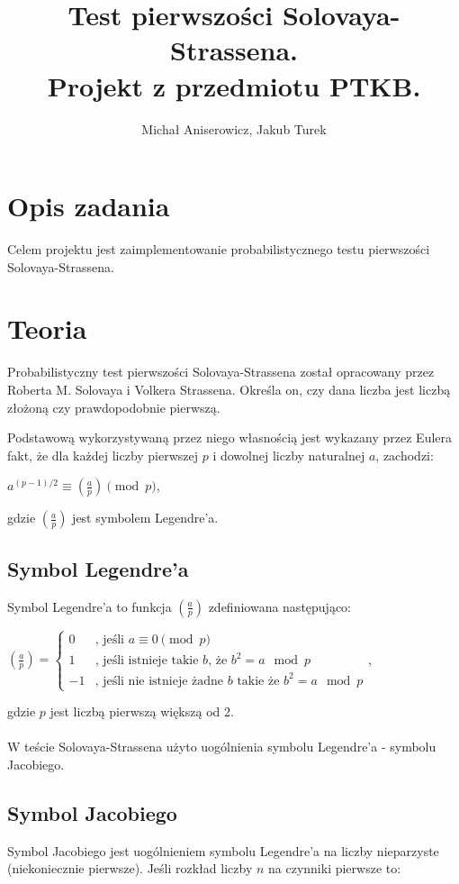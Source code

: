 \documentclass[a4paper,10pt]{article}
\title{Test pierwszości Solovaya-Strassena. \\ \small{Projekt z przedmiotu PTKB.}}
\author{Michał Aniserowicz, Jakub Turek}
\date{}
\begin{document}
\maketitle

\section{Opis zadania} \label{sec:task_desc}
Celem projektu jest zaimplementowanie probabilistycznego testu pierwszości Solovaya-Strassena.

\section{Teoria}
Probabilistyczny test pierwszości Solovaya-Strassena został opracowany przez Roberta M. Solovaya i Volkera Strassena.
Określa on, czy dana liczba jest liczbą złożoną czy prawdopodobnie pierwszą.

Podstawową wykorzystywaną przez niego własnością jest wykazany przez Eulera fakt, że dla każdej liczby pierwszej $p$ i dowolnej liczby naturalnej $a$, zachodzi:

$a^{(p-1)/2} \equiv \left(\frac{a}{p}\right) \pmod p$,

gdzie $\left(\frac{a}{p}\right)$ jest symbolem Legendre'a.

 \subsection{Symbol Legendre'a}
 Symbol Legendre'a to funkcja $\left( \frac a p \right)$ zdefiniowana następująco:

 $
 \left( \frac a p \right) = 
 \begin{cases}
   0 & \mbox{, jeśli $a \equiv 0 \pmod p$} \\
   1 & \mbox{, jeśli istnieje takie $b$, że $b^2=a \mod p$} \\
  -1 & \mbox{, jeśli nie istnieje żadne $b$ takie że $b^2=a \mod p$}
 \end{cases}
 $,

 gdzie $p$ jest liczbą pierwszą większą od 2.
 
 \paragraph{}
 W teście Solovaya-Strassena użyto uogólnienia symbolu Legendre'a - symbolu Jacobiego.

 \subsection{Symbol Jacobiego} \label{sec:jacobi}
 Symbol Jacobiego jest uogólnieniem symbolu Legendre'a na liczby nieparzyste (niekoniecznie pierwsze).
 Jeśli rozkład liczby $n$ na czynniki pierwsze to:
 
\end{document}
